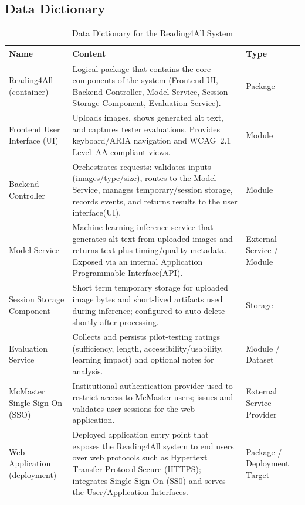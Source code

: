 \documentclass[12pt]{article}
\begin{document}
\subsection{Data Dictionary}
\begin{table}[H]
    \centering
    \caption{Data Dictionary for the Reading4All System}
    \label{tab:data-dictionary-reading4all}
    \begin{tabular}{ |p{3.6cm}|p{7.4cm}|p{3.0cm}| }
      \hline
      \textbf{Name} & \textbf{Content} & \textbf{Type} \\
      \hline
      Reading4All (container) &
      Logical package that contains the core components of the system (Frontend UI, Backend Controller, Model Service, Session Storage Component, Evaluation Service). &
      Package \\
      \hline
      Frontend User Interface (UI) &
      Uploads images, shows generated alt text, and captures tester evaluations. Provides keyboard/ARIA navigation and WCAG~2.1 Level~AA compliant views. &
      Module \\
      \hline
      Backend Controller &
      Orchestrates requests: validates inputs (images/type/size), routes to the Model Service, manages temporary/session storage, records events, and returns results to the user interface(UI). &
      Module \\
      \hline
      Model Service &
      Machine-learning inference service that generates alt text from uploaded images and returns text plus timing/quality metadata. Exposed via an internal Application Programmable Interface(API). &
      External Service / Module \\
      \hline
      Session Storage Component &
      Short term temporary storage for uploaded image bytes and short-lived artifacts used during inference; configured to auto-delete shortly after processing. &
      Storage \\
      \hline
      Evaluation Service &
      Collects and persists pilot-testing ratings (sufficiency, length, accessibility/usability, learning impact) and optional notes for analysis. &
      Module / Dataset \\
      \hline
      McMaster Single Sign On (SSO) &
      Institutional authentication provider used to restrict access to McMaster users; issues and validates user sessions for the web application. &
      External Service Provider \\
      \hline
      Web Application (deployment) &
      Deployed application entry point that exposes the Reading4All system to end users over web protocols such as Hypertext Transfer Protocol Secure (HTTPS); integrates Single Sign On (SS0) and serves the User/Application Interfaces. &
      Package / Deployment Target \\
      \hline
    \end{tabular}
  \end{table}
  
\end{document}
